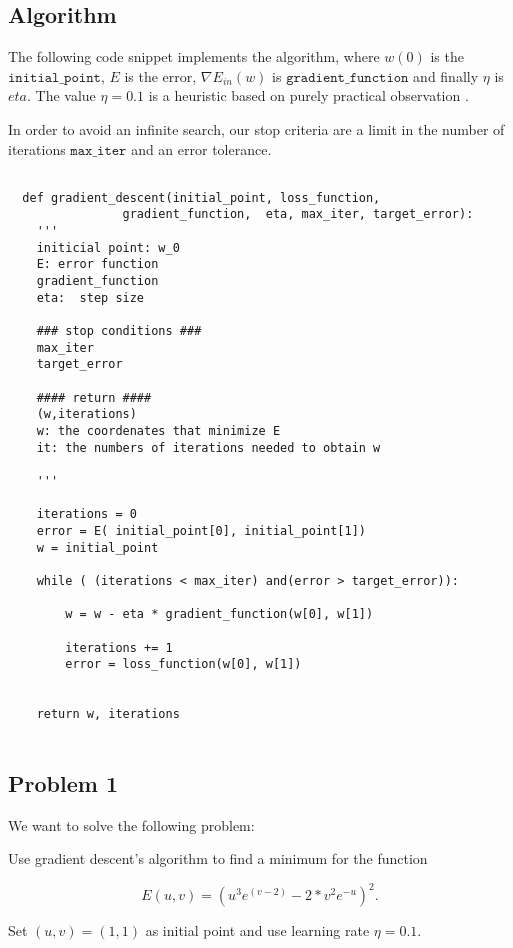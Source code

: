 \subsection{Algorithm}

The following code snippet implements the algorithm, where $w(0)$ is the $\texttt{initial\_point}$, $E$ is the error, $\nabla E_{in}(w)$
is $\texttt{gradient\_function}$ and
finally $\eta$ is $eta.$ The value $\eta = 0.1$ is a heuristic based on purely practical observation \cite{LFD}.


In order to avoid an infinite search, our stop criteria are a limit in the number of iterations $\texttt{max\_iter}$ and an error tolerance. 

\begin{verbatim} 

  def gradient_descent(initial_point, loss_function,
                gradient_function,  eta, max_iter, target_error):
    '''
    initicial point: w_0 
    E: error function 
    gradient_function
    eta:  step size 

    ### stop conditions ###
    max_iter
    target_error

    #### return ####
    (w,iterations)
    w: the coordenates that minimize E
    it: the numbers of iterations needed to obtain w
    
    '''

    iterations = 0
    error = E( initial_point[0], initial_point[1])
    w = initial_point
  
    while ( (iterations < max_iter) and(error > target_error)): 

        w = w - eta * gradient_function(w[0], w[1])
        
        iterations += 1
        error = loss_function(w[0], w[1])
 
    
    return w, iterations
        
\end{verbatim}

\subsection{Problem 1}

We want to solve the following problem: %

Use gradient descent's algorithm to find a minimum for the
function


\[E(u,v) = (u^3 e^{(v-2)} - 2* v^2 e^{-u})^2.\]

Set $(u,v)=(1,1)$ as initial point and use learning rate $\eta = 0.1$.

